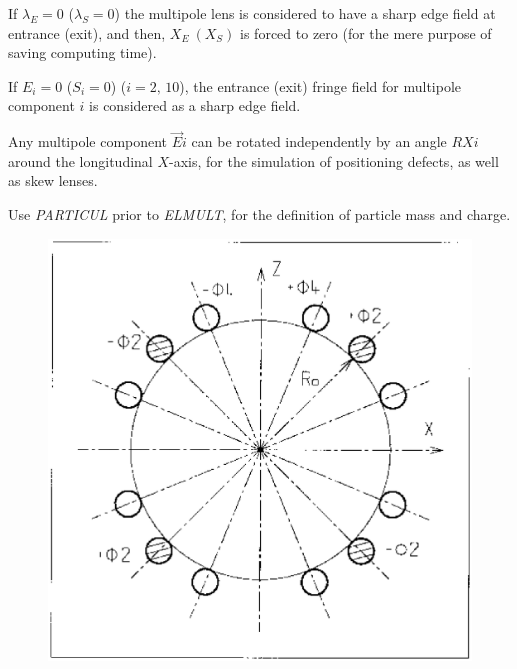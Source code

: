 \noindent If $ \lambda_ E=0 $  ($\lambda_ S=0$)  the multipole lens is
considered to have a sharp edge field at entrance (exit), and then, 
$ X_E \ (X_S) $ is forced to zero (for the mere purpose of saving computing time).  
\medskip

\noindent If $ E_i=0 $  ($S_i=0$) ($i=2,\, 10$), the entrance (exit) fringe field for
multipole component $ i $ is considered as a sharp edge field.  

\medskip

\noindent Any multipole component $ \vec  Ei $ can be rotated
independently by an angle $ RXi $ around the longitudinal $ X$-axis, for the simulation of 
positioning defects, as well as skew lenses. 

\noindent Use \textsl{PARTICUL} prior to \textsl{ELMULT}, for the
 definition of particle mass and charge.

\vfill

\begin{figure}[H]
\centerline{\includegraphics[width=14cm]{Fig21.ps}}
{\setlength{\captionwidth}{13cm}
}\end{figure}
\vfill










